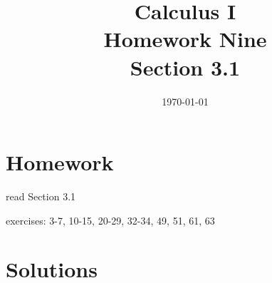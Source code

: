 \documentclass[letterpaper, landscape]{exam}
\title{Calculus I \\ Homework Nine \\ Section 3.1}
\author{}
\date{\today}
\begin{document}
  \maketitle

  \section{Homework}
    \begin{itemize*}
      \item read Section 3.1
      \item exercises: 3-7, 10-15, 20-29, 32-34, 49, 51, 61, 63
    \end{itemize*}

  \ifprintanswers

  \section{Solutions}
\end{document}
